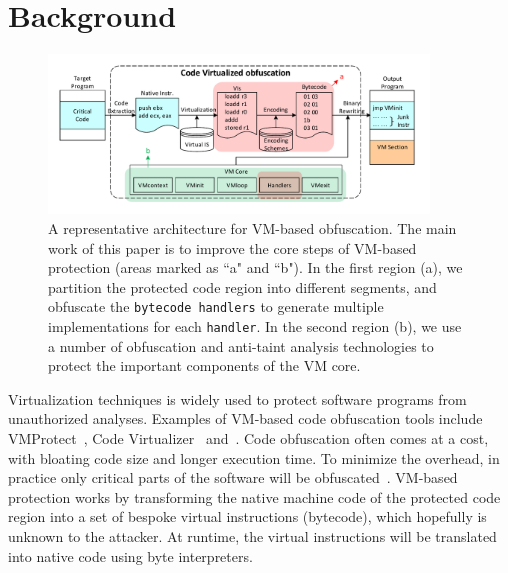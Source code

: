 \section{Background}\label{sec:background}
\begin{figure}[!t]
\centering
\includegraphics[width=0.9\textwidth]{fig/vmprotection.pdf}
\caption{A representative architecture for VM-based obfuscation. The main work of this paper is to improve the core steps of VM-based protection (areas marked as ``a" and ``b").
In the first region (a), we partition the protected code region into different segments, and obfuscate the \texttt{bytecode handlers} to generate multiple implementations for each \texttt{handler}.
In the second region (b), we use a number of obfuscation and anti-taint analysis technologies to protect the important components of the VM core.}
\label{fig:vmprotection}
\end{figure}

Virtualization techniques is widely used to protect software programs from unauthorized analyses.
Examples of VM-based code obfuscation tools include VMProtect~\cite{vmp}, Code Virtualizer~\cite{cv} and~\cite{Themida}.
Code obfuscation often comes at a cost, with bloating code size and longer execution time.
To minimize the overhead, in practice only critical parts of the software will be obfuscated~\cite{geneiatakis2012adaptive}.
VM-based  protection works by transforming the native machine code of the protected code region into
a set of bespoke virtual instructions (bytecode), which hopefully is unknown to the attacker.
At runtime, the virtual instructions will be translated into native code using byte interpreters.



